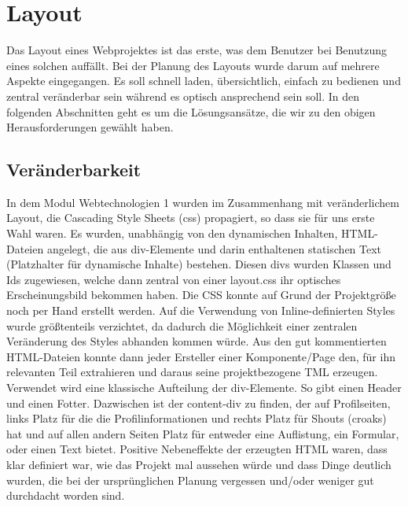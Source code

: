 \section{Layout}
Das Layout eines Webprojektes ist das erste, was dem Benutzer bei Benutzung eines solchen auffällt. Bei der Planung des Layouts wurde darum auf mehrere Aspekte eingegangen. Es soll schnell laden, übersichtlich, einfach zu bedienen und zentral veränderbar sein während es
optisch ansprechend sein soll. In den folgenden Abschnitten geht es um die Lösungsansätze, die wir zu den obigen Herausforderungen gewählt haben.

\subsection*{Veränderbarkeit}
In dem Modul Webtechnologien 1 wurden im Zusammenhang mit veränderlichem Layout, die Cascading Style Sheets (css) propagiert, so dass sie für uns erste Wahl waren. Es wurden, unabhängig von den dynamischen Inhalten, HTML-Dateien angelegt, die aus div-Elemente und darin enthaltenen statischen Text (Platzhalter für dynamische Inhalte) bestehen. Diesen divs wurden Klassen und Ids zugewiesen, welche dann zentral von einer layout.css ihr optisches Erscheinungsbild bekommen haben. Die CSS konnte auf Grund der Projektgröße noch per Hand erstellt werden. Auf die Verwendung von Inline-definierten Styles wurde größtenteils verzichtet, da dadurch die Möglichkeit einer zentralen Veränderung des Styles abhanden kommen würde. 
Aus den gut kommentierten HTML-Dateien konnte dann jeder Ersteller einer Komponente/Page den, für ihn relevanten Teil extrahieren und daraus seine projektbezogene TML erzeugen. Verwendet wird eine klassische Aufteilung der div-Elemente. So gibt einen Header und einen Fotter. Dazwischen ist der content-div zu finden, der auf Profilseiten, links Platz für die die Profilinformationen und rechts Platz für Shouts
(croaks) hat und auf allen andern Seiten Platz für entweder eine Auflistung, ein Formular, oder einen Text bietet. Positive Nebeneffekte der erzeugten HTML waren, dass klar definiert war, wie das Projekt mal aussehen würde und dass Dinge deutlich wurden, die bei der ursprünglichen Planung vergessen und/oder weniger gut durchdacht worden sind.
  
